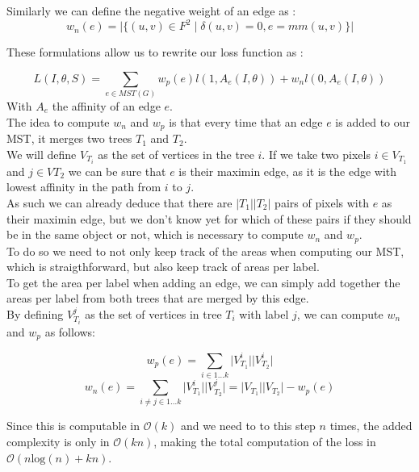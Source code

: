 Similarly we can define the negative weight of an edge as :
\begin{equation*}
	w_n(e)=\lvert \{(u,v)\in F^2 \;|\;\delta(u,v)=0, e=mm(u,v) \}   \rvert
\end{equation*}

These formulations allow us to rewrite our loss function as :

\begin{equation*}
	L(I,\theta,S) = \sum_{e\in MST(G)} w_p(e)l(1,A_e(I,\theta)) + w_nl(0,A_e(I,\theta))
\end{equation*}
With $A_e$ the affinity of an edge $e$.\\

The idea to compute $w_n$ and $w_p$ is that every time that an edge $e$ is
added to our MST, it merges two trees $T_1$ and $T_2$.\\
We will define $V_{T_i}$ as the set of vertices in the tree $i$.
If we take two pixels $i \in V_{T_1}$ and $j \in V{T_2}$ we can be sure that $e$ is
their maximin edge, as it is the edge with lowest affinity in the path from $i$
to $j$. \\
As such we can already deduce that there are $|T_1||T_2|$ pairs of
pixels with $e$ as their maximin edge, but we don't know yet for which of these
pairs if they should be in the same object or not, which is necessary to
compute $w_n$ and $w_p$.\\

To do so we need to not only keep track of the areas when computing our MST,
which is straigthforward, but also keep track of areas per label.\\
To get the area per label when adding an edge, we can simply add together the
areas per label from both trees that are merged by this edge.\\

By defining $V_{T_i}^j$ as the set of vertices in tree $T_i$ with label $j$, we
can compute $w_n$ and $w_p$ as follows: 

\[
	w_p(e) = \sum_{i\in{1\ldots k}} \lvert V_{T_1}^i \rvert \lvert V_{T_2}^i \rvert
\]
\[
	w_n(e) = \sum_{i\neq j \in{1\ldots k}} \lvert V_{T_1}^i \rvert \lvert
	V_{T_2}^j \rvert = \lvert V_{T_1} \rvert \lvert V_{T_2} \rvert - w_p(e)
\]

Since this is computable in $\mathcal{O}(k)$ and we need to to this step $n$
times, the added complexity is only in $\mathcal{O}(kn)$, making the total
computation of the loss in $\mathcal{O}(n\text{log}(n) + kn)$.\\

